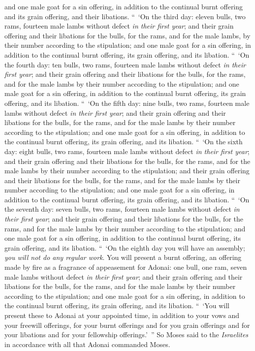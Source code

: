\begin{biblechapter}
\verse and one male goat for a sin offering, in addition to the continual burnt offering and its grain offering, and their libations.
\verse “ ‘On the third day: eleven bulls, two rams, fourteen male lambs without defect \textit{in their first year};
\verse and their grain offering and their libations for the bulls, for the rams, and for the male lambs, by their number according to the stipulation;
\verse and one male goat for a sin offering, in addition to the continual burnt offering, its grain offering, and its libation.
\verse “ ‘On the fourth day: ten bulls, two rams, fourteen male lambs without defect \textit{in their first year};
\verse and their grain offering and their libations for the bulls, for the rams, and for the male lambs by their number according to the stipulation;
\verse and one male goat for a sin offering, in addition to the continual burnt offering, its grain offering, and its libation.
\verse “ ‘On the fifth day: nine bulls, two rams, fourteen male lambs without defect \textit{in their first year};
\verse and their grain offering and their libations for the bulls, for the rams, and for the male lambs by their number according to the stipulation;
\verse and one male goat for a sin offering, in addition to the continual burnt offering, its grain offering, and its libation.
\verse “ ‘On the sixth day: eight bulls, two rams, fourteen male lambs without defect \textit{in their first year}; and their grain offering and their libations for the bulls, for the rams, and for the male lambs by their number according to the stipulation;
\verse and their grain offering and their libations for the bulls, for the rams, and for the male lambs by their number according to the stipulation;
\verse and one male goat for a sin offering, in addition to the continual burnt offering, its grain offering, and its libation.
\verse “ ‘On the seventh day: seven bulls, two rams, fourteen male lambs without defect \textit{in their first year};
\verse and their grain offering and their libations for the bulls, for the rams, and for the male lambs by their number according to the stipulation;
\verse and one male goat for a sin offering, in addition to the continual burnt offering, its grain offering, and its libation.
\verse “ ‘On the eighth day you will have an assembly; \textit{you will not do any regular work}.
\verse You will present a burnt offering, an offering made by fire as a fragrance of appeasement for Adonai: one bull, one ram, seven male lambs without defect \textit{in their first year};
\verse and their grain offering and their libations for the bulls, for the rams, and for the male lambs by their number according to the stipulation;
\verse and one male goat for a sin offering, in addition to the continual burnt offering, its grain offering, and its libation.
\verse “ ‘You will present these to Adonai at your appointed time, in addition to your vows and your freewill offerings, for your burnt offerings and for you grain offerings and for your libations and for your fellowship offerings.’ ”
\verse  So Moses said to the \textit{Israelites} in accordance with all that Adonai commanded Moses.
\end{biblechapter}

